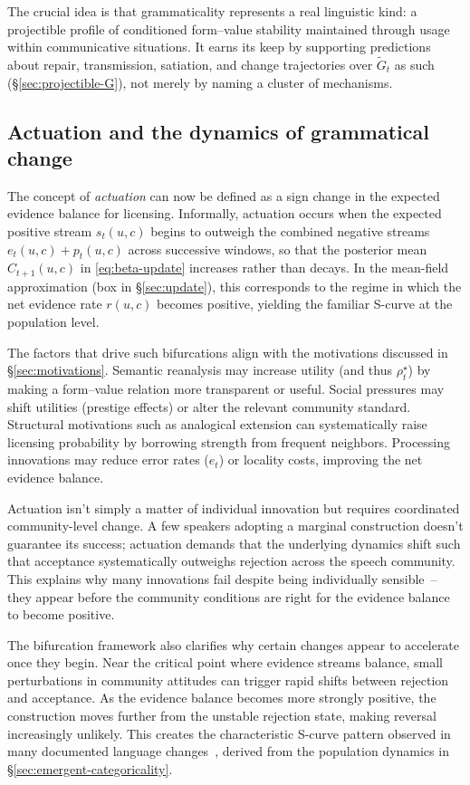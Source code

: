 \documentclass[12pt,letterpaper]{article}
\begin{document}
The crucial idea is that grammaticality represents a real linguistic kind: a projectible profile of conditioned form--value stability maintained through usage within communicative situations. It earns its keep by supporting predictions about repair, transmission, satiation, and change trajectories over $\widetilde{G}_t$ as such (\S\ref{sec:projectible-G}), not merely by naming a cluster of mechanisms.

\subsection{Actuation and the dynamics of grammatical change}

The concept of \textit{actuation} can now be defined as a sign change in the expected evidence balance for licensing. Informally, actuation occurs when the expected positive stream $s_t(u,c)$ begins to outweigh the combined negative streams $e_t(u,c)+p_t(u,c)$ across successive windows, so that the posterior mean $C_{t+1}(u,c)$ in \eqref{eq:beta-update} increases rather than decays. In the mean-field approximation (box in \S\ref{sec:update}), this corresponds to the regime in which the net evidence rate $r(u,c)$ becomes positive, yielding the familiar S-curve at the population level.

The factors that drive such bifurcations align with the motivations discussed in \S\ref{sec:motivations}. Semantic reanalysis may increase utility (and thus $\rho_t^\star$) by making a form--value relation more transparent or useful. Social pressures may shift utilities (prestige effects) or alter the relevant community standard. Structural motivations such as analogical extension can systematically raise licensing probability by borrowing strength from frequent neighbors. Processing innovations may reduce error rates ($e_t$) or locality costs, improving the net evidence balance.

Actuation isn't simply a matter of individual innovation but requires coordinated community-level change. A few speakers adopting a marginal construction doesn't guarantee its success; actuation demands that the underlying dynamics shift such that acceptance systematically outweighs rejection across the speech community. This explains why many innovations fail despite being individually sensible~-- they appear before the community conditions are right for the evidence balance to become positive.

The bifurcation framework also clarifies why certain changes appear to accelerate once they begin. Near the critical point where evidence streams balance, small perturbations in community attitudes can trigger rapid shifts between rejection and acceptance. As the evidence balance becomes more strongly positive, the construction moves further from the unstable rejection state, making reversal increasingly unlikely. This creates the characteristic S-curve pattern observed in many documented language changes~\autocite{kroch1989}, derived from the population dynamics in \S\ref{sec:emergent-categoricality}.
\end{document}

